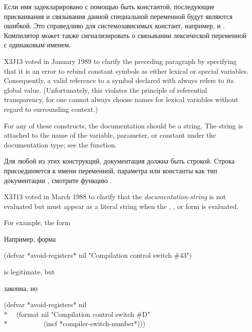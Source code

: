 \begin{defmac}
Если имя задекларировано с помощью  быть константой,
последующие присваивания и связывания данной специальной переменной будут
являются ошибкой. Это справедливо для системозависимых констант, например,
 и .
Компилятор может также сигнализировать о связывании лексической переменной с
одинаковым именем.

\begin{new}
X3J13 voted in January 1989
to clarify the preceding paragraph by specifying
that it is an error to rebind constant symbols
as either lexical or special variables.
Consequently, a valid reference to a symbol declared with 
always refers to its global value.
(Unfortunately, this violates the principle of referential transparency,
for one cannot always choose names for lexical variables without regard
to surrounding context.)
\end{new}

For any of these constructs,
the documentation should be a string.  The string is attached
to the name of the variable, parameter, or constant
under the  documentation type; see the 
function.

Для любой из этих конструкций, документация должна быть строкой. Строка
присоединяется к имени переменной, параметра или константы как тип документации
, смотрите функцию .

\begin{new}
X3J13 voted in March 1988
to clarify that the \textit{documentation-string}
is not evaluated but must appear as a literal string when the ,
, or  form is evaluated.

For example,
the form

Например, форма

\begin{lisp}
(defvar *avoid-registers* nil "Compilation control switch \#43")
\end{lisp}

is legitimate, but

законна, но

\begin{lisp}
(defvar *avoid-registers* nil \\*
~~(format nil "Compilation control switch \#{\Xtilde}D" \\*
~~~~~~~~~~(incf *compiler-switch-number*)))
\end{lisp}


\end{new}
\end{defmac}
